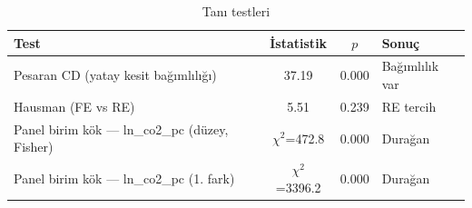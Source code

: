 \documentclass[11pt]{article}
\begin{document}
\begin{table}[t]\centering
\caption{Tanı testleri}
\begin{tabular}{lccl}
\toprule
Test & İstatistik & $p$ & Sonuç \\
\midrule
Pesaran CD (yatay kesit bağımlılığı) & 37.19 & 0.000 & Bağımlılık var \\
Hausman (FE vs RE) & 5.51 & 0.239 & RE tercih \\
Panel birim kök — ln\_co2\_pc (düzey, Fisher) & $\chi^2$=472.8 & 0.000 & Durağan \\
Panel birim kök — ln\_co2\_pc (1. fark) & $\chi^2$=3396.2 & 0.000 & Durağan \\
\bottomrule
\end{tabular}
\end{table}
\end{document}
